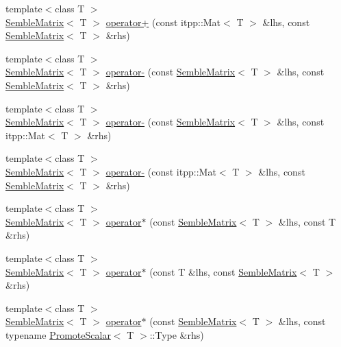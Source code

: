 \begin{DoxyCompactItemize}
\item 
{\footnotesize template$<$class T $>$ }\\\mbox{\hyperlink{structSEMBLE_1_1SembleMatrix}{Semble\+Matrix}}$<$ T $>$ \mbox{\hyperlink{namespaceSEMBLE_a4ca19eff646265f8adc603e9412f2827}{operator+}} (const itpp\+::\+Mat$<$ T $>$ \&lhs, const \mbox{\hyperlink{structSEMBLE_1_1SembleMatrix}{Semble\+Matrix}}$<$ T $>$ \&rhs)
\item 
{\footnotesize template$<$class T $>$ }\\\mbox{\hyperlink{structSEMBLE_1_1SembleMatrix}{Semble\+Matrix}}$<$ T $>$ \mbox{\hyperlink{namespaceSEMBLE_a51078a127a232790773b793b2f6fb149}{operator-\/}} (const \mbox{\hyperlink{structSEMBLE_1_1SembleMatrix}{Semble\+Matrix}}$<$ T $>$ \&lhs, const \mbox{\hyperlink{structSEMBLE_1_1SembleMatrix}{Semble\+Matrix}}$<$ T $>$ \&rhs)
\item 
{\footnotesize template$<$class T $>$ }\\\mbox{\hyperlink{structSEMBLE_1_1SembleMatrix}{Semble\+Matrix}}$<$ T $>$ \mbox{\hyperlink{namespaceSEMBLE_a15e5f0355da81ca6207bb74a62d0b669}{operator-\/}} (const \mbox{\hyperlink{structSEMBLE_1_1SembleMatrix}{Semble\+Matrix}}$<$ T $>$ \&lhs, const itpp\+::\+Mat$<$ T $>$ \&rhs)
\item 
{\footnotesize template$<$class T $>$ }\\\mbox{\hyperlink{structSEMBLE_1_1SembleMatrix}{Semble\+Matrix}}$<$ T $>$ \mbox{\hyperlink{namespaceSEMBLE_aba06b25e41129b1a234ea1c281a99b46}{operator-\/}} (const itpp\+::\+Mat$<$ T $>$ \&lhs, const \mbox{\hyperlink{structSEMBLE_1_1SembleMatrix}{Semble\+Matrix}}$<$ T $>$ \&rhs)
\item 
{\footnotesize template$<$class T $>$ }\\\mbox{\hyperlink{structSEMBLE_1_1SembleMatrix}{Semble\+Matrix}}$<$ T $>$ \mbox{\hyperlink{namespaceSEMBLE_a6158819356a4efaf5146550ba7433038}{operator$\ast$}} (const \mbox{\hyperlink{structSEMBLE_1_1SembleMatrix}{Semble\+Matrix}}$<$ T $>$ \&lhs, const T \&rhs)
\item 
{\footnotesize template$<$class T $>$ }\\\mbox{\hyperlink{structSEMBLE_1_1SembleMatrix}{Semble\+Matrix}}$<$ T $>$ \mbox{\hyperlink{namespaceSEMBLE_a08ce1d5bbc51eda6e5d2a27727f8779c}{operator$\ast$}} (const T \&lhs, const \mbox{\hyperlink{structSEMBLE_1_1SembleMatrix}{Semble\+Matrix}}$<$ T $>$ \&rhs)
\item 
{\footnotesize template$<$class T $>$ }\\\mbox{\hyperlink{structSEMBLE_1_1SembleMatrix}{Semble\+Matrix}}$<$ T $>$ \mbox{\hyperlink{namespaceSEMBLE_a72755a935cffff79de3ac06ac128b07a}{operator$\ast$}} (const \mbox{\hyperlink{structSEMBLE_1_1SembleMatrix}{Semble\+Matrix}}$<$ T $>$ \&lhs, const typename \mbox{\hyperlink{structSEMBLE_1_1PromoteScalar}{Promote\+Scalar}}$<$ T $>$\+::Type \&rhs)

\end{DoxyCompactItemize}
